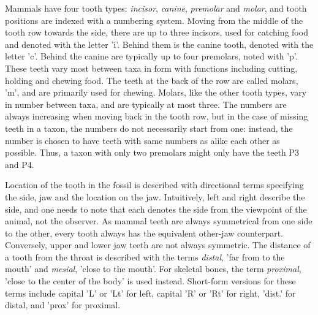 \documentclass[english,twoside,openright]{UH_DS_MSc}
\begin{document}
Mammals have four tooth types: \textit{incisor}, \textit{canine}, \textit{premolar}
and \textit{molar}, and tooth positions are indexed with a numbering system. Moving from the middle of the tooth row
towards the side, there are up to three 
incisors, used for catching food and denoted with the letter 'i'. Behind them is the canine tooth, denoted with the letter 'c'. Behind the canine are typically up to four premolars, noted with 'p'. These 
teeth vary most between taxa in form with functions including cutting, holding and chewing food.
The teeth at the back of the row are called molars, 'm', and are primarily used for chewing. Molars, like the other tooth types, 
vary in number between taxa, and are typically at most three. The numbers are always increasing when moving back in the tooth row, but in
 the case of missing teeth in a taxon, the numbers do not necessarily start from one: instead, the number is chosen to 
have teeth with same numbers as alike each other as possible. Thus, a taxon with only two premolars might only have the teeth P3 and P4.


Location of the tooth in the fossil is described with directional terms specifying the side, jaw and the location on the jaw.
Intuitively, left and right describe the side, and one needs to note that each denotes the side from the viewpoint of the 
animal, not the observer. As mammal teeth are always symmetrical from one side to the other, every tooth always has the equivalent other-jaw counterpart. Conversely, upper and lower jaw teeth are not always symmetric. The distance of a tooth from the throat 
is described with the terms \textit{distal}, 'far from to the mouth' and \textit{mesial}, 'close to the mouth'. For skeletal bones, the term \textit{proximal}, 
'close to the center of the body' is used instead.
Short-form versions for these terms include capital 'L' or 'Lt' for left, capital 'R' or 'Rt' for right, 'dist.' 
for distal, and 'prox' for proximal.
\end{document}
